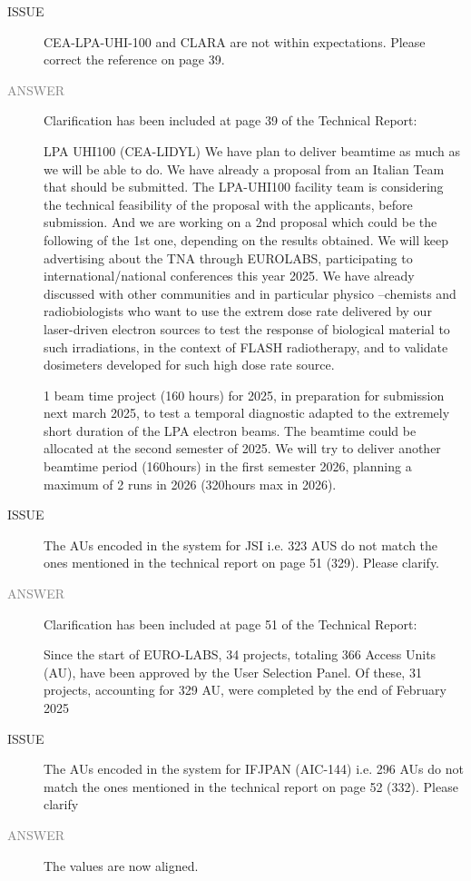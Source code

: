 \begin{prtwo}
\begin{description}
\item[ISSUE] CEA-LPA-UHI-100 and CLARA are not within expectations. Please correct the reference on page 39.
\item[\textcolor{gray}{ANSWER}] Clarification has been included at page 39 of the Technical Report: 

LPA UHI100 (CEA-LIDYL) We have plan to deliver beamtime as much as we will be able to do. We have already a proposal from an Italian Team that should be submitted. The LPA-UHI100 facility team is considering the technical feasibility of the proposal with the applicants, before submission. And we are working on a 2nd proposal which could be the following of the 1st one, depending on the results obtained. We will keep advertising about the TNA through EUROLABS, participating to international/national conferences this year 2025. We have already discussed with other communities and in particular physico –chemists and radiobiologists who want to use the extrem dose rate delivered by our laser-driven electron sources to test the response of biological material to such irradiations, in the context of FLASH radiotherapy, and to validate dosimeters developed for such high dose rate source.

1 beam time project (160 hours) for 2025, in preparation for submission next march 2025, to test a temporal diagnostic adapted to the extremely short duration of the LPA electron beams. The beamtime could be allocated at the second semester of 2025. We will try to deliver another beamtime period (160hours) in the first semester 2026, planning a maximum of 2 runs in 2026 (320hours max in 2026).

\item[ISSUE] The AUs encoded in the system for JSI i.e. 323 AUS do not match the ones mentioned in the technical report on page 51 (329). Please clarify.
\item[\textcolor{gray}{ANSWER}] Clarification has been included at page 51 of the Technical Report:

Since the start of EURO-LABS, 34 projects, totaling 366 Access Units (AU), have been approved by the User Selection Panel. Of these, 31 projects, accounting for 329 AU, were completed by the end of February 2025

\item[ISSUE] The AUs encoded in the system for IFJPAN (AIC-144) i.e. 296 AUs do not match the ones mentioned in the technical report on page 52 (332). Please clarify
\item[\textcolor{gray}{ANSWER}] The values are now aligned.  
\end{description}
\end{prtwo}

